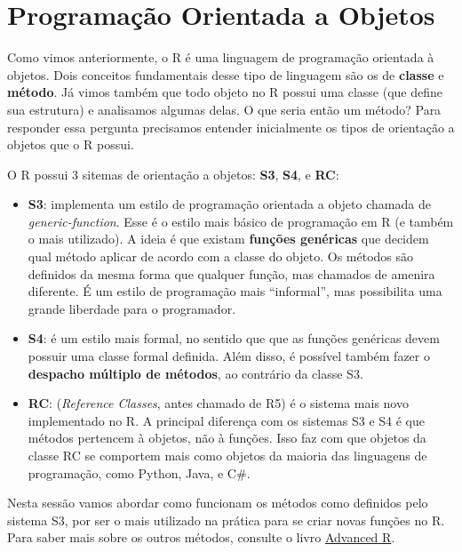 \documentclass[10pt,a4paper]{book}
\providecommand{\tightlist}{%
  \setlength{\itemsep}{0pt}\setlength{\parskip}{0pt}}
\begin{document}
\appendix


\chapter{Programação Orientada a
Objetos}\label{programacao-orientada-a-objetos}

Como vimos anteriormente, o R é uma linguagem de programação orientada à
objetos. Dois conceitos fundamentais desse tipo de linguagem são os de
\textbf{classe} e \textbf{método}. Já vimos também que todo objeto no R
possui uma classe (que define sua estrutura) e analisamos algumas delas.
O que seria então um método? Para responder essa pergunta precisamos
entender inicialmente os tipos de orientação a objetos que o R possui.

O R possui 3 sitemas de orientação a objetos: \textbf{S3}, \textbf{S4},
e \textbf{RC}:

\begin{itemize}
\tightlist
\item
  \textbf{S3}: implementa um estilo de programação orientada a objeto
  chamada de \emph{generic-function}. Esse é o estilo mais básico de
  programação em R (e também o mais utilizado). A ideia é que existam
  \textbf{funções genéricas} que decidem qual método aplicar de acordo
  com a classe do objeto. Os métodos são definidos da mesma forma que
  qualquer função, mas chamados de amenira diferente. É um estilo de
  programação mais ``informal'', mas possibilita uma grande liberdade
  para o programador.
\item
  \textbf{S4}: é um estilo mais formal, no sentido que que as funções
  genéricas devem possuir uma classe formal definida. Além disso, é
  possível também fazer o \textbf{despacho múltiplo de métodos}, ao
  contrário da classe S3.
\item
  \textbf{RC}: (\emph{Reference Classes}, antes chamado de R5) é o
  sistema mais novo implementado no R. A principal diferença com os
  sistemas S3 e S4 é que métodos pertencem à objetos, não à funções.
  Isso faz com que objetos da classe RC se comportem mais como objetos
  da maioria das linguagens de programação, como Python, Java, e C\#.
\end{itemize}

Nesta sessão vamos abordar como funcionam os métodos como definidos pelo
sistema S3, por ser o mais utilizado na prática para se criar novas
funções no R. Para saber mais sobre os outros métodos, consulte o livro
\href{http://adv-r.had.co.nz/OO-essentials.html}{Advanced R}.
\end{document}
